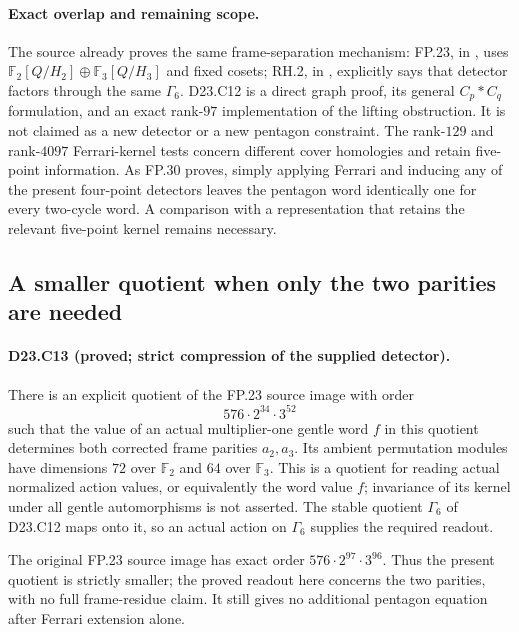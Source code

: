 \paragraph{Exact overlap and remaining scope.}
The source already proves the same frame-separation mechanism:
FP.23, in ,
uses $\mathbb F_2[Q/H_2]\oplus\mathbb F_3[Q/H_3]$ and fixed
cosets; RH.2, in ,
explicitly says that detector factors through the same $\Gamma_6$.
D23.C12 is a direct graph proof, its general $C_p*C_q$ formulation,
and an exact rank-$97$ implementation of the lifting obstruction.
It is not claimed as a new detector or a new pentagon constraint.
The rank-$129$ and rank-$4097$ Ferrari-kernel tests concern different
cover homologies and retain five-point information.  As FP.30 proves,
simply applying Ferrari and inducing any of the present four-point
detectors leaves the pentagon word identically one for every
two-cycle word.  A comparison with a representation that retains
the relevant five-point kernel remains necessary.

\subsection{A smaller quotient when only the two parities are needed}

\paragraph{D23.C13 (proved; strict compression of the supplied detector).}
There is an explicit quotient of the FP.23 source image with order
\[
 576\cdot2^{34}\cdot3^{52}
\]
such that the value of an actual multiplier-one gentle word $f$
in this quotient determines both corrected frame parities
$a_2,a_3$.  Its ambient permutation modules have dimensions
$72$ over $\mathbb F_2$ and $64$ over $\mathbb F_3$.
This is a quotient for reading actual normalized action values,
or equivalently the word value $f$; invariance of its kernel
under all gentle automorphisms is not asserted.  The stable
quotient $\Gamma_6$ of D23.C12 maps onto it, so an actual action
on $\Gamma_6$ supplies the required readout.

The original FP.23 source image has exact order
$576\cdot2^{97}\cdot3^{96}$.  Thus the present quotient is
strictly smaller; the proved readout here concerns the two
parities, with no full frame-residue claim.  It still gives no additional
pentagon equation after Ferrari extension alone.

